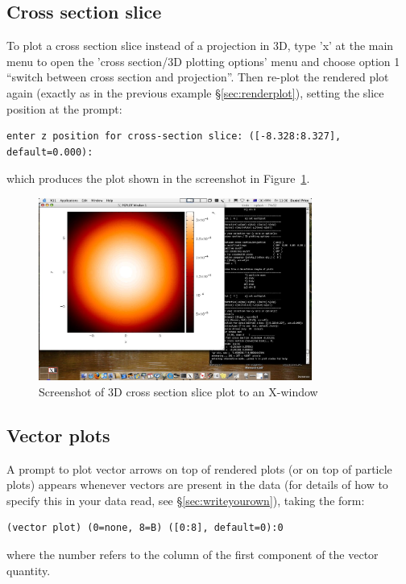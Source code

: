 \documentclass[a4paper,10pt]{article}
\begin{document}
\subsection{Cross section slice}
To plot a cross section slice instead of a projection in 3D, type 'x' at the main menu to open the 'cross section/3D plotting options' menu and choose option 1 ``switch between cross section and projection''. Then re-plot the rendered plot again (exactly as in the previous example \S\ref{sec:renderplot}), setting the slice position at the prompt:
\begin{verbatim}
enter z position for cross-section slice: ([-8.328:8.327], default=0.000):
\end{verbatim}
which produces the plot shown in the screenshot in Figure~\ref{fig:renderplot_xsec}.
\begin{figure}[h]
\begin{center}
\includegraphics[width=0.8\textwidth]{renderplot_xsec.jpg}
\caption{Screenshot of 3D cross section slice plot to an X-window}
\label{fig:renderplot_xsec}
\end{center}
\end{figure}

\subsection{Vector plots}
 A prompt to plot vector arrows on top of rendered plots (or on top of particle plots) appears whenever vectors are present in the data (for details of how to specify this in your data read, see \S\ref{sec:writeyourown}), taking the form:
\begin{verbatim}
(vector plot) (0=none, 8=B) ([0:8], default=0):0
\end{verbatim}
where the number refers to the column of the first component of the vector quantity. 
\end{document}
